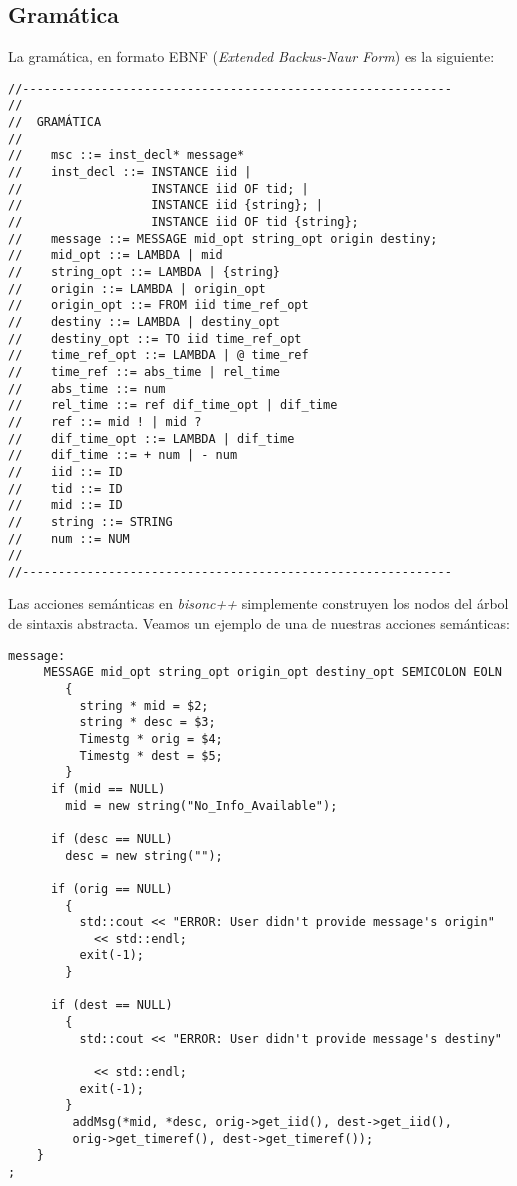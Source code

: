 \documentclass[12pt,a4paper]{report}
\begin{document}
\subsection{Gramática}
La gramática, en formato EBNF (\emph{Extended Backus-Naur Form}) es la siguiente:
\begin{verbatim}
//------------------------------------------------------------
//
//  GRAMÁTICA
//    
//    msc ::= inst_decl* message*
//    inst_decl ::= INSTANCE iid |
//                  INSTANCE iid OF tid; |
//                  INSTANCE iid {string}; |
//                  INSTANCE iid OF tid {string};               
//    message ::= MESSAGE mid_opt string_opt origin destiny;
//    mid_opt ::= LAMBDA | mid
//    string_opt ::= LAMBDA | {string}
//    origin ::= LAMBDA | origin_opt
//    origin_opt ::= FROM iid time_ref_opt
//    destiny ::= LAMBDA | destiny_opt
//    destiny_opt ::= TO iid time_ref_opt
//    time_ref_opt ::= LAMBDA | @ time_ref
//    time_ref ::= abs_time | rel_time
//    abs_time ::= num
//    rel_time ::= ref dif_time_opt | dif_time
//    ref ::= mid ! | mid ?
//    dif_time_opt ::= LAMBDA | dif_time
//    dif_time ::= + num | - num
//    iid ::= ID
//    tid ::= ID
//    mid ::= ID
//    string ::= STRING
//    num ::= NUM
//
//------------------------------------------------------------
\end{verbatim}

Las acciones semánticas en \emph{bisonc++} simplemente construyen los
nodos del árbol de sintaxis abstracta. Veamos un ejemplo de una de nuestras acciones semánticas:
\begin{verbatim}
message:
     MESSAGE mid_opt string_opt origin_opt destiny_opt SEMICOLON EOLN
        { 
	      string * mid = $2;
          string * desc = $3;
          Timestg * orig = $4;
          Timestg * dest = $5;
        }
	  if (mid == NULL)
	    mid = new string("No_Info_Available");

	  if (desc == NULL)
	    desc = new string("");

	  if (orig == NULL)
	    {
	      std::cout << "ERROR: User didn't provide message's origin" 
			<< std::endl;
	      exit(-1);
	    }

	  if (dest == NULL)
	    {
	      std::cout << "ERROR: User didn't provide message's destiny" 

			<< std::endl;
	      exit(-1);
	    }
	     addMsg(*mid, *desc, orig->get_iid(), dest->get_iid(), 
		 orig->get_timeref(), dest->get_timeref());
	}
;
\end{verbatim}
\end{document}
